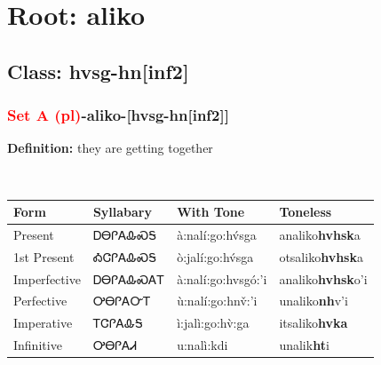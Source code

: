 \needspace{4in}
\section*{Root: aliko}
\nopagebreak
{}
\needspace{3in}
\subsection*{Class: hvsg-hn[inf2]}
\nopagebreak
\needspace{2in}
\subsubsection*{\textcolor{Red}{Set A (pl)}{-}\textbf{aliko}{-}[hvsg-hn[inf2]]}
\nopagebreak
\textbf{Definition: } they are getting together
\\[0.5em]
\begin{tabularx}{\textwidth}{l X X X}%
\toprule%
\textbf{Form}&\textbf{Syllabary}&\textbf{With Tone}&\textbf{Toneless}\\%
\midrule%
Present&ᎠᎾᎵᎪᎲᏍᎦ&à:nalí:go:hv́sga&analiko\textbf{hvhsk}a\\%
1st Present&ᎣᏣᎵᎪᎲᏍᎦ&ò:jalí:go:hv́sga&otsaliko\textbf{hvhsk}a\\%
Imperfective&ᎠᎾᎵᎪᎲᏍᎪᎢ&à:nalí:go:hvsgó:’i&analiko\textbf{hvhsk}o'i\\%
Perfective&ᎤᎾᎵᎪᏅᎢ&ù:nalí:go:hnv̌:’i&unaliko\textbf{nh}v'i\\%
Imperative&ᎢᏣᎵᎪᎲᎦ&ì:jalì:go:hv̀:ga&itsaliko\textbf{hvka}\\%
Infinitive&ᎤᎾᎵᎪᏗ&u:nalì:kdi&unalik\textbf{ht}i\\%
\bottomrule%
\end{tabularx}
\\[1em]